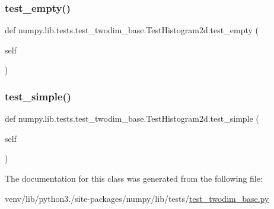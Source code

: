 \subsubsection{\texorpdfstring{test\+\_\+empty()}{test\_empty()}}
{\footnotesize\ttfamily def numpy.\+lib.\+tests.\+test\+\_\+twodim\+\_\+base.\+Test\+Histogram2d.\+test\+\_\+empty (\begin{DoxyParamCaption}\item[{}]{self }\end{DoxyParamCaption})}

\mbox{\label{classnumpy_1_1lib_1_1tests_1_1test__twodim__base_1_1TestHistogram2d_a2cc623fbf51fadc60a3747be52508ea9}} 
\subsubsection{\texorpdfstring{test\+\_\+simple()}{test\_simple()}}
{\footnotesize\ttfamily def numpy.\+lib.\+tests.\+test\+\_\+twodim\+\_\+base.\+Test\+Histogram2d.\+test\+\_\+simple (\begin{DoxyParamCaption}\item[{}]{self }\end{DoxyParamCaption})}



The documentation for this class was generated from the following file\+:\begin{DoxyCompactItemize}
\item 
venv/lib/python3./site-\/packages/numpy/lib/tests/\hyperlink{test__twodim__base_8py}{test\+\_\+twodim\+\_\+base.\+py}\end{DoxyCompactItemize}
